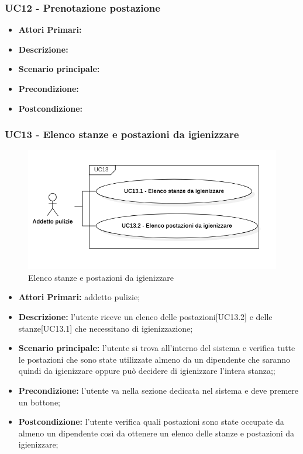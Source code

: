 \subsubsection{ UC12 - Prenotazione postazione}
\begin{itemize}
           	\item\textbf{Attori Primari:} 
           	\item\textbf{Descrizione:} 
           	\item\textbf{Scenario principale:} 
           	\item\textbf{Precondizione:} 
           	\item\textbf{Postcondizione:}
\end{itemize}

\subsubsection{ UC13 - Elenco stanze e postazioni da igienizzare}
\begin{figure}[H]
		\centering
		\includegraphics[width=15cm]{res/images/UC13.png}
		\caption{Elenco stanze e postazioni da igienizzare}
		\label{fig:Elenco stanze e postazioni da igienizzare}
	\end{figure}
\begin{itemize}
           	\item\textbf{Attori Primari:} addetto pulizie;
           	\item\textbf{Descrizione:} l'utente riceve un elenco delle postazioni[UC13.2] e delle stanze[UC13.1] che necessitano di igienizzazione;
           	\item\textbf{Scenario principale:} l'utente si trova all'interno del sistema e verifica tutte le postazioni che sono state utilizzate almeno da un dipendente che saranno quindi da igienizzare oppure può decidere di igienizzare l’intera stanza;;
           	\item\textbf{Precondizione:} l'utente va nella sezione dedicata nel sistema e deve premere un bottone;
           	\item\textbf{Postcondizione:} l'utente verifica quali postazioni sono state occupate da almeno un dipendente così da ottenere un elenco delle stanze e postazioni da igienizzare;
\end{itemize}

